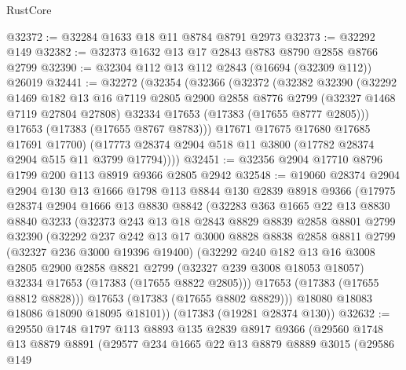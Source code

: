 \begin{lexlean}{RustCore}
\begin{coremodule}
@32372 := @32284 @1633 @18 @11 @8784 @8791 @2973
@32373 := @32292 @149
@32382 := @32373 @1632 @13 @17 @2843 @8783 @8790 @2858 @8766 @2799
@32390 := @32304 @112 @13 @112 @2843 (@16694 (@32309 @112)) @26019
@32441 := @32272
    (@32354
      (@32366
        (@32372
          (@32382
            @32390
            (@32292
              @1469
              @182
              @13
              @16
              @7119
              @2805
              @2900
              @2858
              @8776
              @2799
              (@32327 @1468 @7119 @27804 @27808)
              @32334
              @17653
              (@17383 (@17655 @8777 @2805)))
            @17653
            (@17383 (@17655 @8767 @8783)))
          @17671
          @17675
          @17680
          @17685
          @17691
          @17700)
        (@17773 @28374 @2904 @518 @11 @3800 (@17782 @28374 @2904 @515 @11 @3799 @17794))))
@32451 := @32356 @2904 @17710 @8796 @1799 @200 @113 @8919 @9366 @2805 @2942
@32548 := @19060
    @28374
    @2904
    @2904
    @130
    @13
    @1666
    @1798
    @113
    @8844
    @130
    @2839
    @8918
    @9366
    (@17975
      @28374
      @2904
      @1666
      @13
      @8830
      @8842
      (@32283
        @363
        @1665
        @22
        @13
        @8830
        @8840
        @3233
        (@32373
          @243
          @13
          @18
          @2843
          @8829
          @8839
          @2858
          @8801
          @2799
          @32390
          (@32292
            @237
            @242
            @13
            @17
            @3000
            @8828
            @8838
            @2858
            @8811
            @2799
            (@32327 @236 @3000 @19396 @19400)
            (@32292
              @240
              @182
              @13
              @16
              @3008
              @2805
              @2900
              @2858
              @8821
              @2799
              (@32327 @239 @3008 @18053 @18057)
              @32334
              @17653
              (@17383 (@17655 @8822 @2805)))
            @17653
            (@17383 (@17655 @8812 @8828)))
          @17653
          (@17383 (@17655 @8802 @8829)))
        @18080
        @18083
        @18086
        @18090
        @18095
        @18101))
    (@17383 (@19281 @28374 @130))
@32632 := @29550
    @1748
    @1797
    @113
    @8893
    @135
    @2839
    @8917
    @9366
    (@29560
      @1748
      @13
      @8879
      @8891
      (@29577
        @234
        @1665
        @22
        @13
        @8879
        @8889
        @3015
        (@29586
          @149

\end{coremodule}
\end{lexlean}
